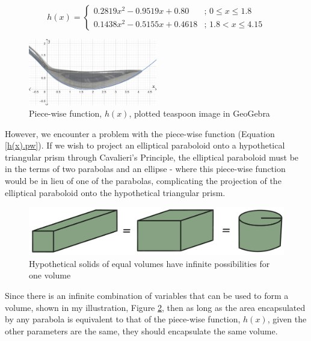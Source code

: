 \documentclass[12pt]{article}
\begin{document}
\begin{equation}\label{h(x).pw}
    h(x)=
    \begin{cases}
        0.2819x^2 - 0.9519x + 0.80 & \text{; } 0 \le x \le 1.8 \\
        0.1438x^2 - 0.5155x + 0.4618 & \text{; } 1.8 < x \le 4.15
    \end{cases}
\end{equation}

\begin{figure}[h]
    \centering
        \includegraphics[width=0.5\textwidth]{images/modelled tsp.jpg}
        \caption{Piece-wise function, $h(x)$, plotted teaspoon image in GeoGebra}
    \label{fig:tsp model}
\end{figure}

However, we encounter a problem with the piece-wise function (Equation \ref{h(x).pw}). If we wish to project an elliptical paraboloid onto a hypothetical triangular prism through Cavalieri's Principle, the elliptical paraboloid must be in the terms of two parabolas and an ellipse - where this piece-wise function would be in lieu of one of the parabolas, complicating the projection of the elliptical paraboloid onto the hypothetical triangular prism.

\begin{figure}[h]
    \centering
        \includegraphics[scale=0.15]{images/volumes equiv.jpg}
        \caption{Hypothetical solids of equal volumes have infinite possibilities for one volume}
    \label{fig:inf volumes}
\end{figure}

Since there is an infinite combination of variables that can be used to form a volume, shown in my illustration, Figure \ref{fig:inf volumes}, then as long as the area encapsulated by any parabola is equivalent to that of the piece-wise function, $h(x)$, given the other parameters are the same, they should encapsulate the same volume. 
\end{document}
